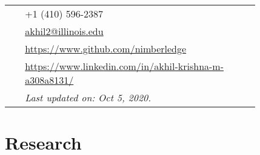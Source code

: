 \documentclass[10pt, oneside, openany]{article} %
\begin{document}
\begin{paracol}{2}
\parbox[top][0.12\textheight][c]{\linewidth}{ %
	\vspace{-0.04\textheight} %
	\colorbox{shade}{ %
		\begin{supertabular}{p{0.05\linewidth}|p{0.775\linewidth}} %
			\raisebox{-1pt}{\faPhone} & +1 (410) 596-2387 \\ %
			\raisebox{0pt}{\small\faEnvelope} & \href{mailto:akhil2@illinois.edu}{akhil2@illinois.edu} \\ %
			\raisebox{-1pt}{\faGithub} & \href{https://www.github.com/nimberledge}{https://www.github.com/nimberledge} \\ %
			\raisebox{-1pt}{\faLinkedinSquare} & \href{https://www.linkedin.com/in/akhil-krishna-m-a308a8131/}{https://www.linkedin.com/in/akhil-krishna-m-a308a8131/} \\ %
			\raisebox{-1pt}{} & \textit{Last updated on: Oct 5, 2020.}\\
		\end{supertabular}
	}
}


\section{Research}





\begin{supertabular}{rl} %
		

\end{supertabular}
\end{paracol}
\end{document}

